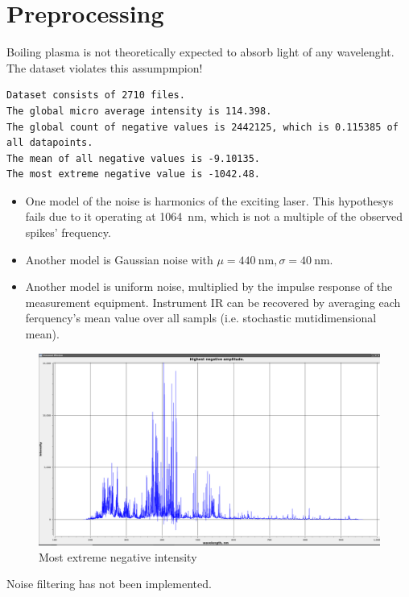 \documentclass{article}
\begin{document}
\section{Preprocessing}
Boiling plasma is not theoretically expected to absorb light of any wavelenght.
The dataset violates this assumpmpion!
\par
\begin{verbatim}
Dataset consists of 2710 files.
The global micro average intensity is 114.398.
The global count of negative values is 2442125, which is 0.115385 of all datapoints.
The mean of all negative values is -9.10135.
The most extreme negative value is -1042.48.
\end{verbatim}
\begin{itemize}
\item{One model of the noise is harmonics of the exciting laser.
This hypothesys fails due to it operating at \SI{1064}{\nano\metre}, which is not a multiple of the observed spikes' frequency.}
\item{Another model is Gaussian noise with $\mu=\SI{440}{\nano\metre}, \sigma=\SI{40}{\nano\metre}$.}
\item{Another model is uniform noise, multiplied by the impulse response of the measurement equipment.
Instrument IR can be recovered by averaging each ferquency's mean value over all sampls (i.e. stochastic mutidimensional mean).}
\end{itemize}
\begin{figure}
\caption{Most extreme negative intensity}
\centering
\includegraphics[width=1.25\textwidth]{img/negatives}
\end{figure}
Noise filtering has not been implemented.
\end{document}
